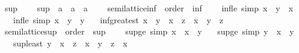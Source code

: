 \begin{isabellebody}
\ sup\ {\isacharequal}{\kern0pt}\isanewline
\ \ \ sup\ {\isacharcolon}{\kern0pt}{\isacharcolon}{\kern0pt}\ {\isachardoublequoteopen}{\isacharprime}{\kern0pt}a\ {\isasymRightarrow}\ {\isacharprime}{\kern0pt}a\ {\isasymRightarrow}\ {\isacharprime}{\kern0pt}a{\isachardoublequoteclose}\ {\isacharparenleft}{\kern0pt}\ {\isachardoublequoteopen}{\isasymsqunion}{\isachardoublequoteclose}\ {}{}{\isacharparenright}{\kern0pt}%
\isadelimdocument
%
\endisadelimdocument
%
\isatagdocument
%
\isamarkuptrue%
%
\endisatagdocument
{\isafolddocument}%
%
\isadelimdocument
%
\endisadelimdocument
{}\isamarkupfalse%
\ semilattice{\isacharunderscore}{\kern0pt}inf\ {\isacharequal}{\kern0pt}\ order\ {\isacharplus}{\kern0pt}\ inf\ {\isacharplus}{\kern0pt}\isanewline
\ \ \ inf{\isacharunderscore}{\kern0pt}le{}\ {\isacharbrackleft}{\kern0pt}simp{\isacharbrackright}{\kern0pt}{\isacharcolon}{\kern0pt}\ {\isachardoublequoteopen}x\ {\isasymsqinter}\ y\ {\isasymle}\ x{\isachardoublequoteclose}\isanewline
\ \ \ inf{\isacharunderscore}{\kern0pt}le{}\ {\isacharbrackleft}{\kern0pt}simp{\isacharbrackright}{\kern0pt}{\isacharcolon}{\kern0pt}\ {\isachardoublequoteopen}x\ {\isasymsqinter}\ y\ {\isasymle}\ y{\isachardoublequoteclose}\isanewline
\ \ \ inf{\isacharunderscore}{\kern0pt}greatest{\isacharcolon}{\kern0pt}\ {\isachardoublequoteopen}x\ {\isasymle}\ y\ {\isasymLongrightarrow}\ x\ {\isasymle}\ z\ {\isasymLongrightarrow}\ x\ {\isasymle}\ y\ {\isasymsqinter}\ z{\isachardoublequoteclose}\isanewline
\isanewline
{}\isamarkupfalse%
\ semilattice{\isacharunderscore}{\kern0pt}sup\ {\isacharequal}{\kern0pt}\ order\ {\isacharplus}{\kern0pt}\ sup\ {\isacharplus}{\kern0pt}\isanewline
\ \ \ sup{\isacharunderscore}{\kern0pt}ge{}\ {\isacharbrackleft}{\kern0pt}simp{\isacharbrackright}{\kern0pt}{\isacharcolon}{\kern0pt}\ {\isachardoublequoteopen}x\ {\isasymle}\ x\ {\isasymsqunion}\ y{\isachardoublequoteclose}\isanewline
\ \ \ sup{\isacharunderscore}{\kern0pt}ge{}\ {\isacharbrackleft}{\kern0pt}simp{\isacharbrackright}{\kern0pt}{\isacharcolon}{\kern0pt}\ {\isachardoublequoteopen}y\ {\isasymle}\ x\ {\isasymsqunion}\ y{\isachardoublequoteclose}\isanewline
\ \ \ sup{\isacharunderscore}{\kern0pt}least{\isacharcolon}{\kern0pt}\ {\isachardoublequoteopen}y\ {\isasymle}\ x\ {\isasymLongrightarrow}\ z\ {\isasymle}\ x\ {\isasymLongrightarrow}\ y\ {\isasymsqunion}\ z\ {\isasymle}\ x{\isachardoublequoteclose}\isanewline

\end{isabellebody}

